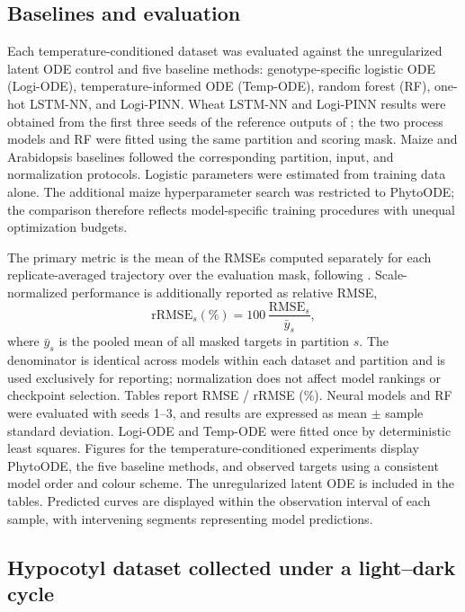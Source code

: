 \documentclass[preprint,12pt,authoryear]{elsarticle}
\begin{document}
\subsection{Baselines and evaluation}

Each temperature-conditioned dataset was evaluated against the unregularized latent ODE control and five baseline methods: genotype-specific logistic ODE (Logi-ODE), temperature-informed ODE (Temp-ODE), random forest (RF), one-hot LSTM-NN, and Logi-PINN. Wheat LSTM-NN and Logi-PINN results were obtained from the first three seeds of the reference outputs of \citet{shao2026pinn}; the two process models and RF were fitted using the same partition and scoring mask. Maize and Arabidopsis baselines followed the corresponding partition, input, and normalization protocols. Logistic parameters were estimated from training data alone. The additional maize hyperparameter search was restricted to PhytoODE; the comparison therefore reflects model-specific training procedures with unequal optimization budgets.

The primary metric is the mean of the RMSEs computed separately for each replicate-averaged trajectory over the evaluation mask, following \citet{shao2026pinn}. Scale-normalized performance is additionally reported as relative RMSE,
\begin{equation}
 \mathrm{rRMSE}_s(\%)=100\,\frac{\mathrm{RMSE}_s}{\bar y_s},
 \label{eq:rrmse}
\end{equation}
where $\bar y_s$ is the pooled mean of all masked targets in partition $s$. The denominator is identical across models within each dataset and partition and is used exclusively for reporting; normalization does not affect model rankings or checkpoint selection. Tables report RMSE / rRMSE (\%). Neural models and RF were evaluated with seeds 1--3, and results are expressed as mean $\pm$ sample standard deviation. Logi-ODE and Temp-ODE were fitted once by deterministic least squares. Figures for the temperature-conditioned experiments display PhytoODE, the five baseline methods, and observed targets using a consistent model order and colour scheme. The unregularized latent ODE is included in the tables. Predicted curves are displayed within the observation interval of each sample, with intervening segments representing model predictions.


\subsection{Hypocotyl dataset collected under a light--dark cycle}
\label{subsec:hypocotyldata}
\end{document}
